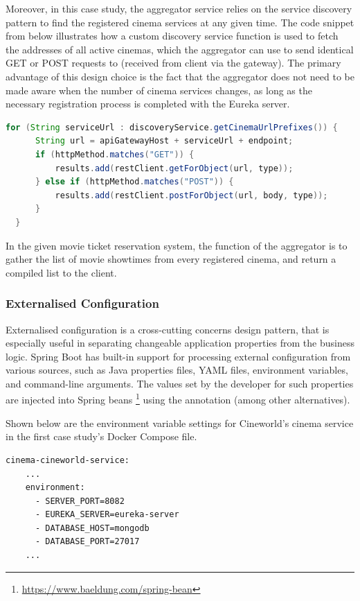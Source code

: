 Moreover, in this case study, the aggregator service relies on the service discovery pattern to find the registered cinema services at any given time. The code snippet from  below illustrates how a custom discovery service function is used to fetch the addresses of all active cinemas, which the aggregator can use to send identical GET or POST requests to (received from client via the gateway). The primary advantage of this design choice is the fact that the aggregator does not need to be made aware when the number of cinema services changes, as long as the necessary registration process is completed with the Eureka server.

\begin{lstlisting}[language=Java, caption=Snippet from \code{AggregatorService.java}]
  for (String serviceUrl : discoveryService.getCinemaUrlPrefixes()) {
      String url = apiGatewayHost + serviceUrl + endpoint;
      if (httpMethod.matches("GET")) {
          results.add(restClient.getForObject(url, type));
      } else if (httpMethod.matches("POST")) {
          results.add(restClient.postForObject(url, body, type));
      }
  }
\end{lstlisting}

In the given movie ticket reservation system, the function of the aggregator is to gather the list of movie showtimes from every registered cinema, and return a compiled list to the client.

\subsubsection{Externalised Configuration}

Externalised configuration is a cross-cutting concerns design pattern, that is especially useful in separating changeable application properties from the business logic. Spring Boot has built-in support for processing external configuration from various sources, such as Java properties files, YAML files, environment variables, and command-line arguments. The values set by the developer for such properties are injected into Spring beans \footnote{\url{https://www.baeldung.com/spring-bean}} using the  annotation (among other alternatives).

Shown below are the environment variable settings for Cineworld's cinema service in the first case study's Docker Compose file.
\begin{lstlisting}[caption=Snippet from \code{docker-compose.yml}]
  cinema-cineworld-service:
    ...
    environment:
      - SERVER_PORT=8082
      - EUREKA_SERVER=eureka-server
      - DATABASE_HOST=mongodb
      - DATABASE_PORT=27017
    ...
\end{lstlisting}

